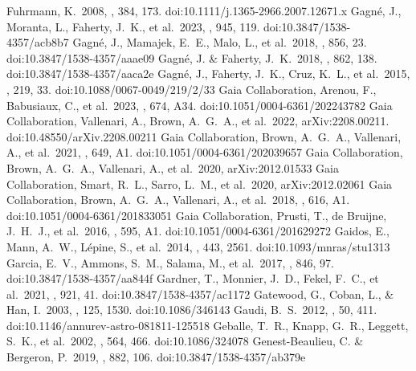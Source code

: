 \documentclass[twocolumn,tighten,twocolappendix]{aastex631}
\begin{document}
\begin{thebibliography}{}
 Fuhrmann, K.\ 2008, \mnras, 384, 173. doi:10.1111/j.1365-2966.2007.12671.x
 Gagn{\'e}, J., Moranta, L., Faherty, J.~K., et al.\ 2023, \apj, 945, 119. doi:10.3847/1538-4357/acb8b7
 Gagn{\'e}, J., Mamajek, E.~E., Malo, L., et al.\ 2018, \apj, 856, 23. doi:10.3847/1538-4357/aaae09
 Gagn{\'e}, J. \& Faherty, J.~K.\ 2018, \apj, 862, 138. doi:10.3847/1538-4357/aaca2e
 Gagn{\'e}, J., Faherty, J.~K., Cruz, K.~L., et al.\ 2015, \apjs, 219, 33. doi:10.1088/0067-0049/219/2/33
 Gaia Collaboration, Arenou, F., Babusiaux, C., et al.\ 2023, \aap, 674, A34. doi:10.1051/0004-6361/202243782
 Gaia Collaboration, Vallenari, A., Brown, A.~G.~A., et al.\ 2022, arXiv:2208.00211. doi:10.48550/arXiv.2208.00211
 Gaia Collaboration, Brown, A.~G.~A., Vallenari, A., et al.\ 2021, \aap, 649, A1. doi:10.1051/0004-6361/202039657
 Gaia Collaboration, Brown, A.~G.~A., Vallenari, A., et al.\ 2020, arXiv:2012.01533
 Gaia Collaboration, Smart, R.~L., Sarro, L.~M., et al.\ 2020, arXiv:2012.02061
 Gaia Collaboration, Brown, A.~G.~A., Vallenari, A., et al.\ 2018, \aap, 616, A1. doi:10.1051/0004-6361/201833051
 Gaia Collaboration, Prusti, T., de Bruijne, J.~H.~J., et al.\ 2016, \aap, 595, A1. doi:10.1051/0004-6361/201629272
 Gaidos, E., Mann, A.~W., L{\'e}pine, S., et al.\ 2014, \mnras, 443, 2561. doi:10.1093/mnras/stu1313
 Garcia, E.~V., Ammons, S.~M., Salama, M., et al.\ 2017, \apj, 846, 97. doi:10.3847/1538-4357/aa844f
 Gardner, T., Monnier, J.~D., Fekel, F.~C., et al.\ 2021, \apj, 921, 41. doi:10.3847/1538-4357/ac1172
 Gatewood, G., Coban, L., \& Han, I.\ 2003, \aj, 125, 1530. doi:10.1086/346143
 Gaudi, B.~S.\ 2012, \araa, 50, 411. doi:10.1146/annurev-astro-081811-125518
 Geballe, T.~R., Knapp, G.~R., Leggett, S.~K., et al.\ 2002, \apj, 564, 466. doi:10.1086/324078
 Genest-Beaulieu, C. \& Bergeron, P.\ 2019, \apj, 882, 106. doi:10.3847/1538-4357/ab379e

\end{thebibliography}
\end{document}
